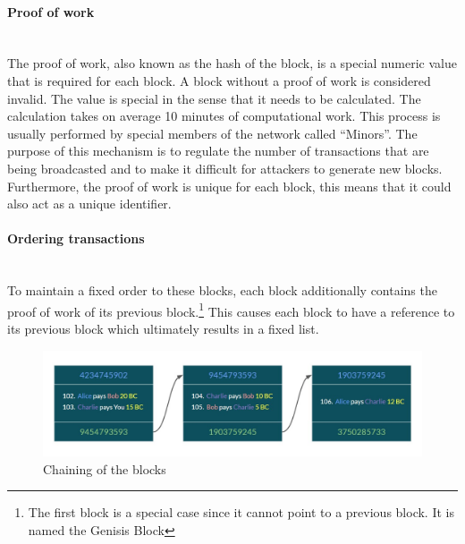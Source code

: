 \documentclass[a4paper, 12pt]{report}
\begin{document}
\paragraph{Proof of work} \hspace{0pt} \\
The proof of work, also known as the hash of the block, is a special numeric value that is required for each block. A block without a proof of work is considered invalid. The value is special in the sense that it needs to be calculated. The calculation takes on average 10 minutes of computational work. This process is usually performed by special members of the network called “Minors”. The purpose of this mechanism is to regulate the number of transactions that are being broadcasted and to make it difficult for attackers to generate new blocks. Furthermore, the proof of work is unique for each block, this means that it could also act as a unique identifier.
\paragraph{Ordering transactions} \hspace{0pt} \\
To maintain a fixed order to these blocks, each block additionally contains the proof of work of its previous block.\footnote{The first block is a special case since it cannot point to a previous block. It is named the Genisis Block} This causes each block to have a reference to its previous block which ultimately results in a fixed list.

\begin{figure}[h]
	\includegraphics[width=\textwidth]{03_Linked_Blocks}
	\caption{Chaining of the blocks}
	\label{fig:03_Linked_Blocks}
\end{figure}
\end{document}
